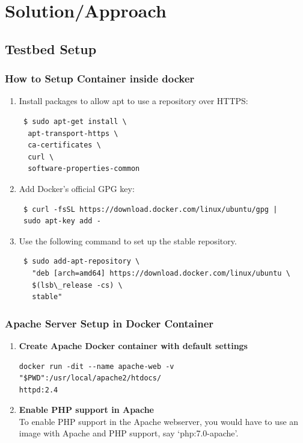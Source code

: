 \documentclass[a4paper,12pt]{article}
\begin{document}
\section{Solution/Approach}
\subsection{Testbed Setup}
\subsubsection{How to Setup Container inside docker}
\begin{enumerate}

\item Install packages to allow apt to use a repository over HTTPS: \\
\begin{verbatim} $ sudo apt-get install \ 
  apt-transport-https \
  ca-certificates \
  curl \ 
  software-properties-common
    \end{verbatim}
\item Add Docker’s official GPG key: \\
\begin{verbatim} $ curl -fsSL https://download.docker.com/linux/ubuntu/gpg |
 sudo apt-key add - \end{verbatim}
\item  Use the following command to set up the stable repository.  \\
\begin{verbatim} $ sudo add-apt-repository \ 
   "deb [arch=amd64] https://download.docker.com/linux/ubuntu \ 
   $(lsb\_release -cs) \ 
   stable"
   \end{verbatim}
\end{enumerate}

\subsubsection{Apache Server Setup in Docker Container}
\begin{enumerate}
  \item \textbf{Create Apache Docker container with default settings} \\
  \begin{verbatim}docker run -dit --name apache-web -v "$PWD":/usr/local/apache2/htdocs/
httpd:2.4\end{verbatim}
  \item  \textbf{Enable PHP support in Apache} \\
  To enable PHP support in the Apache webserver, you would have to use an image with Apache and PHP support, say ‘php:7.0-apache’.
\end{enumerate}
\end{document}
